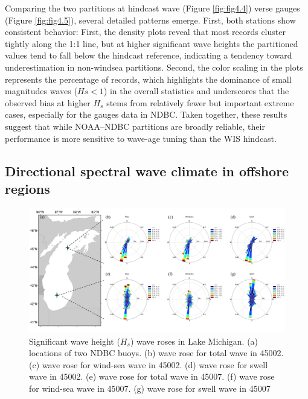 Comparing the two partitions at hindcast wave (Figure \ref{fig:fig4.4}) verse
gauges (Figure \ref{fig:fig4.5}), several detailed patterns emerge. First, both
stations show consistent behavior: First, the density plots reveal that most
records cluster tightly along the 1:1 line, but at higher significant wave
heights the partitioned values tend to fall below the hindcast reference,
indicating a tendency toward underestimation in non-windsea partitions. Second,
the color scaling in the plots represents the percentage of records, which
highlights the dominance of small magnitudes waves ($Hs<1$) in the overall
statistics and underscores that the observed bias at higher $H_s$ stems from
relatively fewer but important extreme cases, especially for the gauges data in
NDBC. Taken together, these results suggest that while NOAA–NDBC partitions are
broadly reliable, their performance is more sensitive to wave-age tuning than
the WIS hindcast.

\subsection{Directional spectral wave climate in offshore regions}
\label{Directional spectral wave climate in offshore regions}

\begin{figure}[htbp]
  \centering
  \includegraphics[width=1\textwidth]{chapter4/resources/ndbc_hs_rose.png}
  \caption{Significant wave height ($H_s$) wave roses in Lake Michigan. (a)
  locations of two NDBC buoys. (b) wave rose for total wave in 45002. (c) wave
  rose for wind-sea wave in 45002. (d) wave rose for swell wave in 45002. (e)
  wave rose for total wave in 45007. (f) wave rose for wind-sea wave in 45007.
  (g) wave rose for swell wave in 45007}
  \label{fig:ndbc_hs_rose}
\end{figure}

